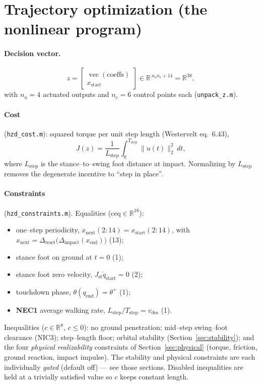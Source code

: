 \documentclass[11pt,a4paper]{article}
\newcommand{\fname}[1]{\texttt{#1}}          %
\begin{document}
\section{Trajectory optimization (the nonlinear program)}
\paragraph{Decision vector.}
\begin{equation}
  z = \begin{bmatrix} \operatorname{vec}(\text{coeffs}) \\ x_{\text{start}} \end{bmatrix}
    \in \mathbb{R}^{\,n_u n_c + 14} = \mathbb{R}^{38},
\end{equation}
with $n_u=4$ actuated outputs and $n_c=6$ control points each
(\fname{unpack\_z.m}).

\paragraph{Cost} (\fname{hzd\_cost.m}): squared torque per unit step length
(Westervelt eq.~6.43),
\begin{equation}
  J(z) = \frac{1}{L_{\text{step}}}\int_0^{T_{\text{step}}} \lVert u(t)\rVert_2^2\, dt,
\end{equation}
where $L_{\text{step}}$ is the stance--to--swing foot distance at impact.
Normalizing by $L_{\text{step}}$ removes the degenerate incentive to
``step in place''.

\paragraph{Constraints} (\fname{hzd\_constraints.m}). Equalities
($\mathrm{ceq}\in\mathbb{R}^{18}$):
\begin{itemize}
  \item one--step periodicity, $x_{\text{next}}(2\!:\!14) = x_{\text{start}}(2\!:\!14)$, with
        $x_{\text{next}} = \Delta_{\text{reset}}\!\big(\Delta_{\text{impact}}(x_{\text{end}})\big)$ \hfill (13);
  \item stance foot on ground at $t=0$ \hfill (1);
  \item stance foot zero velocity, $J_{\mathrm{st}}\dot q_{\text{start}}=0$ \hfill (2);
  \item touchdown phase, $\theta(q_{\text{end}}) = \theta^{+}$ \hfill (1);
  \item \textbf{NEC1} average walking rate, $L_{\text{step}}/T_{\text{step}} = v_{\text{des}}$ \hfill (1).
\end{itemize}
Inequalities ($c\in\mathbb{R}^{8}$, $c\le 0$): no ground penetration; mid--step
swing--foot clearance (NIC3); step--length floor; orbital stability
(Section~\ref{sec:stability}); and the four \emph{physical realizability}
constraints of Section~\ref{sec:physical} (torque, friction, ground reaction,
impact impulse). The stability and physical constraints are each individually
\emph{gated} (default off) --- see those sections. Disabled inequalities are
held at a trivially satisfied value so $c$ keeps constant length.
\end{document}
